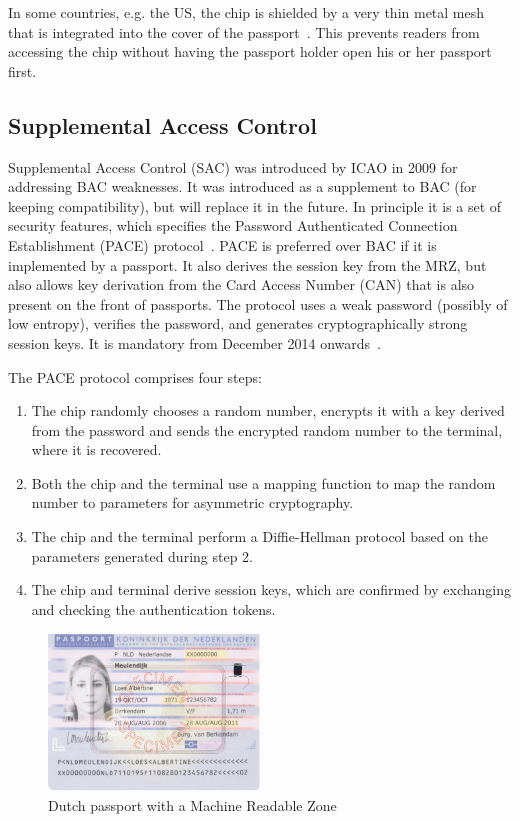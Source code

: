 In some countries, e.g. the US, the chip is shielded by a very thin metal mesh that is integrated into the cover of the passport~\cite{encuspassports}. This prevents readers from accessing the chip without having the passport holder open his or her passport first.

\subsection{Supplemental Access Control}
Supplemental Access Control (SAC) was introduced by ICAO in 2009 for addressing BAC weaknesses. It was introduced as a supplement to BAC (for keeping compatibility), but will replace it in the future. In principle it is a set of security features, which specifies the Password Authenticated Connection Establishment (PACE) protocol~\cite{icao}. PACE is preferred over BAC if it is implemented by a passport. It also derives the session key from the MRZ, but also allows key derivation from the Card Access Number (CAN) that is also present on the front of passports. The protocol uses a weak password (possibly of low entropy), verifies the password, and generates cryptographically strong session keys. It is mandatory from December 2014 onwards~\cite{gemalto}.

The PACE protocol comprises four steps:
\begin{enumerate}
	\item The chip randomly chooses a random number, encrypts it with a key derived from the password and sends the encrypted random number to the terminal, where it is recovered.
  \item Both the chip and the terminal use a mapping function to map the random number to parameters for asymmetric cryptography. 
  \item The chip and the terminal perform a Diffie-Hellman protocol based on the parameters generated during step 2. 
  \item The chip and terminal derive session keys, which are confirmed by exchanging and checking the authentication tokens.
\end{enumerate}

\begin{figure}[htb]
	\centering
		\includegraphics[width=0.50\textwidth]{images/dutchpassport.png}
	\caption{Dutch passport with a Machine Readable Zone}
	\label{fig:dutchpassport}
\end{figure}

